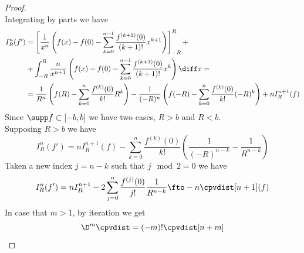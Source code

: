 \documentclass[../mmf.tex]{subfiles}
\begin{document}
\begin{proof}
\begin{equation*}
	\end{equation*}
	Integrating by parts we have
	\begin{equation*}
		\begin{aligned}
			I_R^n(f')&=\left[ \frac{1}{x^n}\left( f(x)-f(0)-\sum_{k=0}^{n-1}\frac{f^{(k+1)}(0)}{(k+1)!}x^{k+1} \right) \right]^R_{-R}+\\
			&+\int_{-R}^{R}\frac{n}{x^{n+1}}\left( f(x)-f(0)-\sum_{k=0}^{n-1}\frac{f^{(k+1)}(0)}{(k+1)!}x^k \right)\diff x=\\
			&=\frac{1}{R^n}\left( f(R)-\sum_{k=0}^{n}\frac{f^{(k)}(0)}{k!}R^k \right)-\frac{1}{(-R)^n}\left( f(-R)-\sum_{k=0}^{n}\frac{f^{(k)}(0)}{k!}(-R)^k \right)+nI_R^{n+1}(f)
		\end{aligned}
	\end{equation*}
	Since $\supp f\subset[-b,b]$ we have two cases, $R>b$ and $R<b$.\\
	Supposing $R>b$ we have
	\begin{equation*}
		I^n_R(f')=nI^{n+1}_R(f)-\sum_{k=0}^{n}\frac{f^{(k)}(0)}{k!}\left( \frac{1}{(-R)^{n-k}}-\frac{1}{R^{n-k}} \right)
	\end{equation*}
	Taken a new index $j=n-k$ such that $j\mod 2=0$ we have
	\begin{equation*}
		I_R^n(f')=nI_R^{n+1}-2\sum_{j=0}^{n}\frac{f^{(j)}(0)}{j!}\frac{1}{R^{n-k}}\fto-n\cpvdist[n+1](f)
	\end{equation*}
	In case that $m>1$, by iteration we get
	\begin{equation*}
		\D^m\cpvdist=(-m)!\cpvdist[n+m]
	\end{equation*}
\end{proof}
\end{document}
